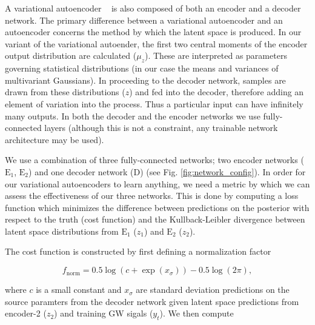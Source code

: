 \documentclass[%
showpacs,
 amsmath,amssymb,
 aps,
 twocolumn,
 prl,
 reprint,
floatfix,
]{revtex4-1}
\begin{document}
%
%
A variational autoencoder ~\cite{1812.04405} is also composed of both an
encoder and a decoder network. The primary difference between a variational
autoencoder and an autoencoder concerns the method by which the latent space is
produced. In our variant of the variational autoender, the first two central 
moments of the encoder output distribution are calculated ($\mu_{z}$). These are
interpreted as parameters governing statistical distributions (in our case the
means and variances of multivariant Gaussians). In proceeding to the decoder
network, samples are drawn from these distributions ($z$) and fed into the
decoder, therefore adding an element of variation into the process.  Thus a
particular input can have infinitely many outputs. In both the decoder and the
encoder networks we use fully-connected layers (although this is not a
constraint, any trainable network architecture may be used).


%
%
We use a combination of three fully-connected networks; two encoder networks ($\textrm{E}_1$,
$\textrm{E}_2$) and one decoder network (D) (see Fig.
\ref{fig:network_config}). In order for our variational autoencoders to learn anything, we need a metric by which 
we can assess the effectiveness of our three networks. This is done by computing 
a loss function which minimizes the difference 
between predictions on the posterior with respect to the truth (cost function) and the Kullback-Leibler divergence 
between latent space distributions from $\textrm{E}_1$ ($z_1$) and 
$\textrm{E}_2$ ($z_2$). 

%
%
The cost function is constructed by first defining a normalization factor

\begin{equation}
    f_{\textrm{norm}} = 0.5 \log(c + \exp(x_{\sigma})) - 0.5 \log(2\pi),
\end{equation}

where $c$ is a small constant and $x_{\sigma}$ are standard deviation predictions 
on the source paramters from the decoder network given latent space predictions 
from encoder-2 ($z_2$) and training GW sigals ($y_{t}$). We then 
compute 
\end{document}
